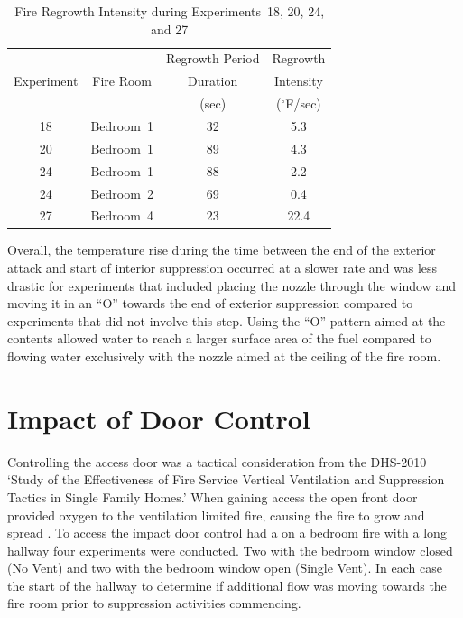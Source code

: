 \documentclass[12pt,oneside]{book}
\begin{document}
\begin{table}[H]
\centering
\caption{Fire Regrowth Intensity during Experiments~18, 20, 24, and 27}
\begin{tabular}{|c|c|c|c|} 
\hline
\multirow{3}{*}{Experiment} & \multirow{3}{*}{Fire Room} 	& Regrowth Period & Regrowth  \\ 
							& 								& Duration 		  & Intensity \\
							& 								& (sec) 		  & ($^\circ$F/sec) \\							
\hline \hline
18 							& Bedroom~1 					& 32 			  & 5.3 	\\ \hline
20 							& Bedroom~1 					& 89 			  & 4.3 	\\ \hline
24 							& Bedroom~1 					& 88 			  & 2.2 	\\ \hline
24 							& Bedroom~2 					& 69 			  & 0.4 	\\ \hline
27 							& Bedroom~4 					& 23 			  & 22.4 	\\ \hline
\end{tabular}
\label{table:regrowth_intensity}
\end{table}

Overall, the temperature rise during the time between the end of the exterior attack and start of interior suppression occurred at a slower rate and was less drastic for experiments that included placing the nozzle through the window and moving it in an ``O'' towards the end of exterior suppression compared to experiments that did not involve this step. Using the ``O'' pattern aimed at the contents allowed water to reach a larger surface area of the fuel compared to flowing water exclusively with the nozzle aimed at the ceiling of the fire room.

\section{Impact of Door Control}
Controlling the access door was a tactical consideration from the DHS-2010 `Study of the Effectiveness of Fire Service Vertical Ventilation and Suppression Tactics in Single Family Homes.' When gaining access the open front door provided oxygen to the ventilation limited fire, causing the fire to grow and spread \cite{DHS2010}. To access the impact door control had a on a bedroom fire with a long hallway four experiments were conducted. Two with the bedroom window closed (No Vent) and two with the bedroom window open (Single Vent). In each case the start of the hallway to determine if additional flow was moving towards the fire room prior to suppression activities commencing. 
\end{document}
